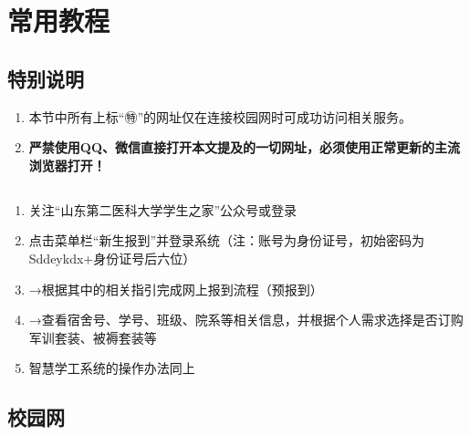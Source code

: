 \section[常用教程]{常用教程}

\subsection*{特别说明}
\begin{enumerate}
    \item 本节中所有上标“㊕”的网址仅在连接校园网时可成功访问相关服务。
    \item \textbf{严禁使用QQ、微信直接打开本文提及的一切网址，必须使用正常更新的主流浏览器打开！}
\end{enumerate}

\subsection[新生信息查询、线上报到]{}
\label{freshman_query}
\begin{enumerate}
    \item 关注“山东第二医科大学学生之家”公众号或登录
    \item 点击菜单栏“新生报到”并登录系统（注：账号为身份证号，初始密码为Sddeykdx+身份证号后六位）
    \item →根据其中的相关指引完成网上报到流程（预报到）
    \item →查看宿舍号、学号、班级、院系等相关信息，并根据个人需求选择是否订购军训套装、被褥套装\footnotemark 等
    \item 智慧学工系统的操作办法同上
\end{enumerate}

\subsection[校园网]{校园网}
